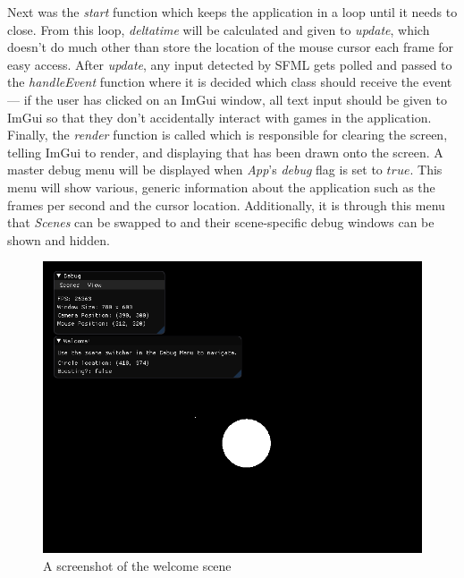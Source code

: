 \documentclass[11pt, a4paper]{report}
\begin{document}
Next was the \emph{start} function which keeps the application in a loop until it needs to close. From this loop, \emph{deltatime} will be calculated and given to \emph{update}, which doesn't do much other than store the location of the mouse cursor each frame for easy access. After \emph{update}, any input detected by SFML gets polled and passed to the \emph{handleEvent} function where it is decided which class should receive the event --- if the user has clicked on an ImGui window, all text input should be given to ImGui so that they don't accidentally interact with games in the application. Finally, the \emph{render} function is called which is responsible for clearing the screen, telling ImGui to render, and displaying that has been drawn onto the screen. A master debug menu will be displayed when \emph{App}'s \emph{debug} flag is set to $true$. This menu will show various, generic information about the application such as the frames per second and the cursor location. Additionally, it is through this menu that \emph{Scenes} can be swapped to and their scene-specific debug windows can be shown and hidden.

\begin{figure}[!h]
  \centering
  \includegraphics[width=\linewidth]{img/welcome_scene.png}
  \caption{A screenshot of the welcome scene}
  \label{fig:welcomeScene}
\end{figure}
\end{document}
